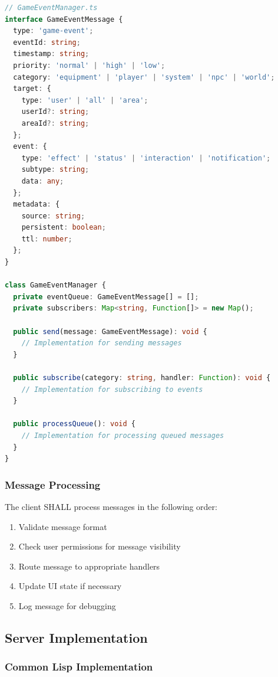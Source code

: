 \documentclass[12pt,a4paper]{article}
\begin{document}
\begin{lstlisting}[language=TypeScript, caption=GameEventManager Interface]
// GameEventManager.ts
interface GameEventMessage {
  type: 'game-event';
  eventId: string;
  timestamp: string;
  priority: 'normal' | 'high' | 'low';
  category: 'equipment' | 'player' | 'system' | 'npc' | 'world';
  target: {
    type: 'user' | 'all' | 'area';
    userId?: string;
    areaId?: string;
  };
  event: {
    type: 'effect' | 'status' | 'interaction' | 'notification';
    subtype: string;
    data: any;
  };
  metadata: {
    source: string;
    persistent: boolean;
    ttl: number;
  };
}

class GameEventManager {
  private eventQueue: GameEventMessage[] = [];
  private subscribers: Map<string, Function[]> = new Map();

  public send(message: GameEventMessage): void {
    // Implementation for sending messages
  }

  public subscribe(category: string, handler: Function): void {
    // Implementation for subscribing to events
  }

  public processQueue(): void {
    // Implementation for processing queued messages
  }
}
\end{lstlisting}

\subsubsection{Message Processing}

The client SHALL process messages in the following order:

\begin{enumerate}
\item Validate message format
\item Check user permissions for message visibility
\item Route message to appropriate handlers
\item Update UI state if necessary
\item Log message for debugging
\end{enumerate}

\subsection{Server Implementation}

\subsubsection{Common Lisp Implementation}
\end{document}
